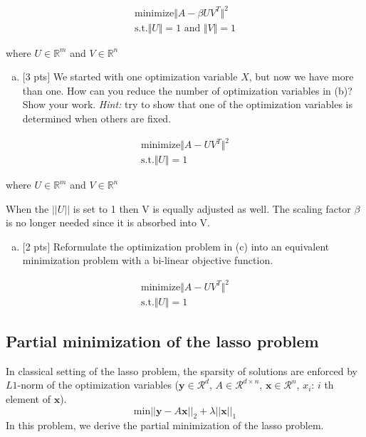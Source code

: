 \documentclass[12pt]{article}
\begin{document}
\begin{align*}
\text{minimize} \Vert A-\beta UV^T \Vert^{2} \\
\text{s.t.} \Vert U\Vert = 1 \text{ and }\Vert V \Vert =1 
\end{align*}

where $U \in \mathbb{R}^{m}$ and $V \in \mathbb{R}^{n}$


\begin{enumerate}[(c)]
\item 
$[$3 pts$]$ We started with one optimization variable $X$, but now we have more than one. How can you reduce the number of optimization variables in (b)? Show your work. {\it Hint:} try to show that one of the optimization variables is determined when others are fixed.
\end{enumerate}
\vspace{.25cm}

\begin{align*}
\text{minimize} \Vert A- UV^T \Vert^{2} \\
\text{s.t.} \Vert U\Vert = 1 
\end{align*}

where $U \in \mathbb{R}^{m}$ and $V \in \mathbb{R}^{n}$

When the $||U||$ is set to 1 then V is equally adjusted as well. The scaling factor $\beta$ is no longer needed since it is absorbed into V. 

\begin{enumerate}[(d)]
\item 
$[$2 pts$]$ Reformulate the optimization problem in (c) into an equivalent minimization problem with a bi-linear objective function.
\end{enumerate}

\begin{align*}
\text{minimize} \Vert A- UV^T \Vert^{2} \\
\text{s.t.} \Vert U\Vert = 1 
\end{align*}


\vspace{.25cm}

\subsection{Partial minimization of the lasso problem}

In classical setting of the lasso problem, the sparsity of solutions are enforced by $L1$-norm of the optimization variables ($\mathbf{y} \in \mathcal{R}^{d}$, $A \in \mathcal{R}^{d\times n}$, $\mathbf{x}\in \mathcal{R}^{n}$, $x_{i}$: $i$ th element of $\mathbf{x}$).
\begin{equation}
	\text{min}||\mathbf{y}-A\mathbf{x}||_{2}+\lambda ||\mathbf{x}||_{1}
	\label{lasso}
	\nonumber
\end{equation}
In this problem, we derive the partial minimization of the lasso problem.
\end{document}
